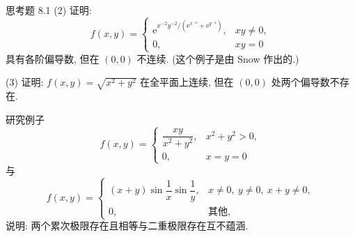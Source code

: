 \begin{exblock}{思考题 8.1}
  (2) 证明:
  \[
    f(x, y) = \begin{cases}
      \mathrm{e}^{x^{-2}y^{-2}/(\mathrm{e}^{x^{-4}} + \mathrm{e}^{y^{-4}})}, & xy \neq 0, \\
      0, & xy = 0
    \end{cases}
  \]
  具有各阶偏导数, 但在 $(0, 0)$ 不连续. (这个例子是由 Snow 作出的.)

  (3) 证明: $f(x, y) = \sqrt{x^{2} + y^{2}}$ 在全平面上连续, 但在 $(0, 0)$ 处两个偏导数不存在.

  \item 研究例子
  \[
    f(x, y) = \begin{cases}
      \dfrac{xy}{x^{2} + y^{2}}, & x^{2} + y^{2} > 0, \\
      0, & x = y = 0
    \end{cases}
  \]
  与
  \[
    f(x, y) = \begin{cases}
      (x + y)\sin\dfrac{1}{x}\sin\dfrac{1}{y}, & x \neq 0,\ y \neq 0,\ x + y \neq 0, \\
      0, & \text{其他},
    \end{cases}
  \]
  说明: 两个累次极限存在且相等与二重极限存在互不蕴涵.
\end{exblock}
